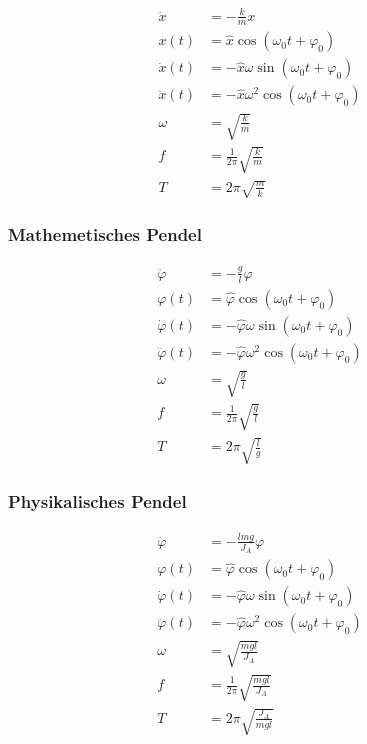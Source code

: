 \begin{align*}
\ddot{x}&=-\frac{k}{m}x\\
x(t)&=\hat{x}\cos(\omega_0 t+\varphi_0)\\
\dot{x}(t)&=-\hat{x}\omega\sin(\omega_0 t+\varphi_0)\\
\ddot{x}(t)&=-\hat{x}\omega^2\cos(\omega_0 t+\varphi_0)\\
\omega&=\sqrt{\frac{k}{m}}\\
f&=\frac{1}{2\pi}\sqrt{\frac{k}{m}}\\
T&=2\pi\sqrt{\frac{m}{k}}
\end{align*}

\begin{multicols}{2}{}
\subsubsection{Mathemetisches Pendel}
\begin{align*}
\ddot{\varphi}&=-\frac{g}{l}\varphi\\
\varphi(t)&=\hat{\varphi}\cos(\omega_0 t+\varphi_0)\\
\dot{\varphi}(t)&=-\hat{\varphi}\omega\sin(\omega_0 t+\varphi_0)\\
\ddot{\varphi}(t)&=-\hat{\varphi}\omega^2\cos(\omega_0 t+\varphi_0)\\
\omega&=\sqrt{\frac{g}{l}}\\
f&=\frac{1}{2\pi}\sqrt{\frac{g}{l}}\\
T&=2\pi\sqrt{\frac{l}{g}}
\end{align*}



\subsubsection{Physikalisches Pendel}
\begin{align*}
\ddot{\varphi}&=-\frac{lmg}{J_A}\varphi\\
\varphi(t)&=\hat{\varphi}\cos(\omega_0 t+\varphi_0)\\
\dot{\varphi}(t)&=-\hat{\varphi}\omega\sin(\omega_0 t+\varphi_0)\\
\ddot{\varphi}(t)&=-\hat{\varphi}\omega^2\cos(\omega_0 t+\varphi_0)\\
\omega&=\sqrt{\frac{mgl}{J_A}}\\
f&=\frac{1}{2\pi}\sqrt{\frac{mgl}{J_A}}\\
T&=2\pi\sqrt{\frac{J_A}{mgl}}
\end{align*}
\end{multicols}

